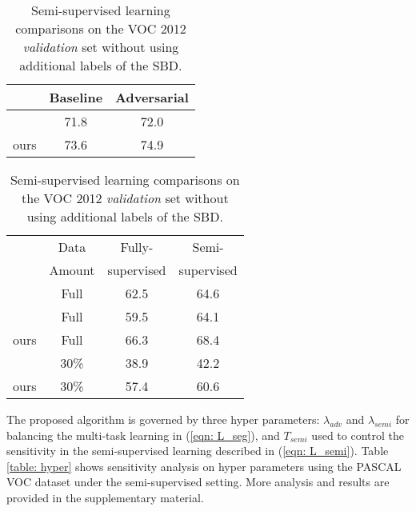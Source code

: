 \documentclass{bmvc2k}
\begin{document}
	\begin{table}
		\begin{minipage}[t]{.49\linewidth}
			\scriptsize
			\caption{Adversarial learning comparison with \cite{luc2016semantic} on the VOC 2012 \emph{validation} set.}
			\vspace{5mm}
			\label{table: adversarial_comp}
			\centering
			\begin{tabular}{lcc}
				\toprule
				& Baseline & Adversarial \\
				\midrule
				\cite{luc2016semantic} & 71.8 & 72.0\\
				ours & 73.6 & 74.9 \\
				
				\bottomrule
			\end{tabular}
		\end{minipage}
		\hfill
		\begin{minipage}[t]{.49\linewidth}
			
			\scriptsize
			\caption{Semi-supervised learning comparisons on the VOC 2012 \emph{validation} set without using additional labels of the SBD.}
			\vspace{1mm}
			\label{table: semi_comp}
			\centering
			\begin{tabular}{lccc}
				\toprule
				& Data & Fully- & Semi- \\
				& Amount& supervised & supervised \\
				\midrule
				\cite{papandreou2015weakly} & Full & 62.5 & 64.6 \\
				\cite{souly2017semi} & Full & 59.5 & 64.1\\
				ours & Full & 66.3 & 68.4 \\
				\midrule
				\cite{souly2017semi} & 30\% & 38.9 & 42.2\\
				ours & 30\% & 57.4 & 60.6 \\
				\bottomrule
			\end{tabular}
		\end{minipage}
		\vspace{-5mm}
	\end{table}
	
	
	\vspace{-2mm}{\flushleft \bf Hyper-parameter analysis.}
	The proposed algorithm is governed by three hyper parameters: $\lambda_{adv}$ and $\lambda_{semi}$ for balancing the multi-task learning in (\ref{eqn: L_seg}), and $T_{semi}$ used to control the sensitivity in the semi-supervised learning described in (\ref{eqn: L_semi}).
	Table \ref{table: hyper} shows sensitivity analysis on hyper parameters using the PASCAL VOC dataset under the semi-supervised setting. 
	More analysis and results are provided in the supplementary material.
	
\end{document}
